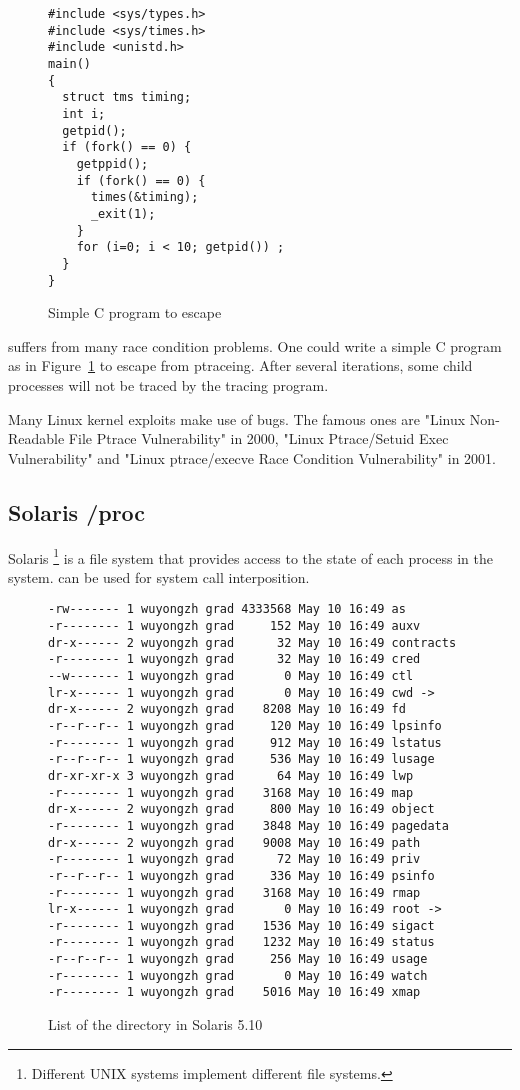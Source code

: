 \begin{figure}[htb]
\begin{verbatim}
#include <sys/types.h>
#include <sys/times.h>
#include <unistd.h>
main()
{
  struct tms timing;
  int i;
  getpid();
  if (fork() == 0) {
    getppid();
    if (fork() == 0) {
      times(&timing);
      _exit(1);
    }
    for (i=0; i < 10; getpid()) ;
  }
}
\end{verbatim}
\caption{Simple C program to escape }
\label{fig:ptrace-bug}
\end{figure}

suffers from many race condition problems\cite{garfinkel2003traps}. One could write a simple C
program as in Figure~\ref{fig:ptrace-bug} to escape from ptraceing. After several iterations, some
child processes will not be traced by the tracing program.

Many Linux kernel
exploits make use of  bugs. The famous ones are "Linux Non-Readable File
Ptrace Vulnerability" in 2000, "Linux Ptrace/Setuid Exec Vulnerability" and
"Linux ptrace/execve Race Condition Vulnerability" in 2001.

\subsection{Solaris /proc}

Solaris \cite{faulkner1991process}\footnote{Different UNIX systems implement
different  file systems.}
is a file system that provides access to the state of each process
in the system.  can be used for system call interposition.

\begin{figure}[htb]
\begin{verbatim}
-rw------- 1 wuyongzh grad 4333568 May 10 16:49 as
-r-------- 1 wuyongzh grad     152 May 10 16:49 auxv
dr-x------ 2 wuyongzh grad      32 May 10 16:49 contracts
-r-------- 1 wuyongzh grad      32 May 10 16:49 cred
--w------- 1 wuyongzh grad       0 May 10 16:49 ctl
lr-x------ 1 wuyongzh grad       0 May 10 16:49 cwd ->
dr-x------ 2 wuyongzh grad    8208 May 10 16:49 fd
-r--r--r-- 1 wuyongzh grad     120 May 10 16:49 lpsinfo
-r-------- 1 wuyongzh grad     912 May 10 16:49 lstatus
-r--r--r-- 1 wuyongzh grad     536 May 10 16:49 lusage
dr-xr-xr-x 3 wuyongzh grad      64 May 10 16:49 lwp
-r-------- 1 wuyongzh grad    3168 May 10 16:49 map
dr-x------ 2 wuyongzh grad     800 May 10 16:49 object
-r-------- 1 wuyongzh grad    3848 May 10 16:49 pagedata
dr-x------ 2 wuyongzh grad    9008 May 10 16:49 path
-r-------- 1 wuyongzh grad      72 May 10 16:49 priv
-r--r--r-- 1 wuyongzh grad     336 May 10 16:49 psinfo
-r-------- 1 wuyongzh grad    3168 May 10 16:49 rmap
lr-x------ 1 wuyongzh grad       0 May 10 16:49 root ->
-r-------- 1 wuyongzh grad    1536 May 10 16:49 sigact
-r-------- 1 wuyongzh grad    1232 May 10 16:49 status
-r--r--r-- 1 wuyongzh grad     256 May 10 16:49 usage
-r-------- 1 wuyongzh grad       0 May 10 16:49 watch
-r-------- 1 wuyongzh grad    5016 May 10 16:49 xmap
\end{verbatim}
\caption{List of the  directory in Solaris 5.10}
\label{fig:proc}
\end{figure}

